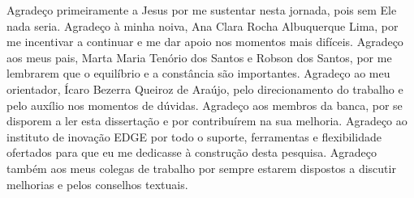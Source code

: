 \begin{agradecimentos}

Agradeço primeiramente a Jesus por me sustentar nesta jornada, pois sem Ele nada seria. Agradeço à minha noiva, Ana Clara Rocha Albuquerque Lima, por me incentivar a continuar e me dar apoio nos momentos mais difíceis. Agradeço aos meus pais, Marta Maria Tenório dos Santos e Robson dos Santos, por me lembrarem que o equilíbrio e a constância são importantes. Agradeço ao meu orientador, Ícaro Bezerra Queiroz de Araújo, pelo direcionamento do trabalho e pelo auxílio nos momentos de dúvidas. Agradeço aos membros da banca, por se disporem a ler esta dissertação e por contribuírem na sua melhoria. Agradeço ao instituto de inovação EDGE por todo o suporte, ferramentas e flexibilidade ofertados para que eu me dedicasse à construção desta pesquisa. Agradeço também aos meus colegas de trabalho por sempre estarem dispostos a discutir melhorias e pelos conselhos textuais.

\end{agradecimentos}
